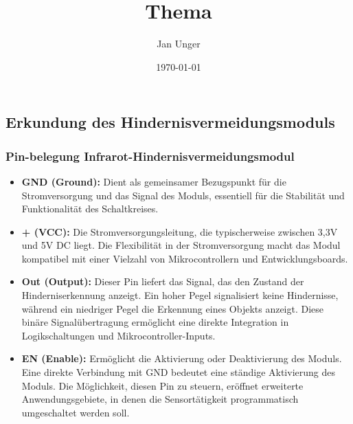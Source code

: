 \documentclass{vorlage-design-main}
\title{Thema}
\author{Jan Unger}
\date{\today}
\begin{document}
\maketitle

\begin{abstract}

\end{abstract}

\hypertarget{erkundung-des-hindernisvermeidungsmoduls}{%
\subsection{Erkundung des
Hindernisvermeidungsmoduls}\label{erkundung-des-hindernisvermeidungsmoduls}}

\hypertarget{pin-belegung-infrarot-hindernisvermeidungsmodul}{%
\subsubsection{Pin-belegung
Infrarot-Hindernisvermeidungsmodul}\label{pin-belegung-infrarot-hindernisvermeidungsmodul}}

\begin{itemize}

\item
  \textbf{GND (Ground):} Dient als gemeinsamer Bezugspunkt für die
  Stromversorgung und das Signal des Moduls, essentiell für die
  Stabilität und Funktionalität des Schaltkreises.
\item
  \textbf{+ (VCC):} Die Stromversorgungsleitung, die typischerweise
  zwischen 3,3V und 5V DC liegt. Die Flexibilität in der Stromversorgung
  macht das Modul kompatibel mit einer Vielzahl von Mikrocontrollern und
  Entwicklungsboards.
\item
  \textbf{Out (Output):} Dieser Pin liefert das Signal, das den Zustand
  der Hinderniserkennung anzeigt. Ein hoher Pegel signalisiert keine
  Hindernisse, während ein niedriger Pegel die Erkennung eines Objekts
  anzeigt. Diese binäre Signalübertragung ermöglicht eine direkte
  Integration in Logikschaltungen und Mikrocontroller-Inputs.
\item
  \textbf{EN (Enable):} Ermöglicht die Aktivierung oder Deaktivierung
  des Moduls. Eine direkte Verbindung mit GND bedeutet eine ständige
  Aktivierung des Moduls. Die Möglichkeit, diesen Pin zu steuern,
  eröffnet erweiterte Anwendungsgebiete, in denen die Sensortätigkeit
  programmatisch umgeschaltet werden soll.
\end{itemize}
\end{document}
